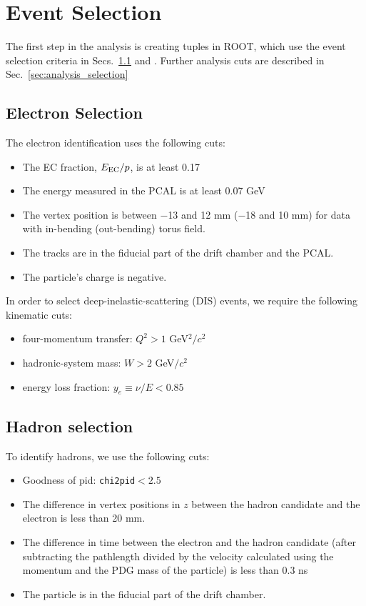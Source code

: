 \section{Event Selection} \label{sec:eventselection}
The first step in the analysis is creating tuples in ROOT, which use the event selection criteria in Secs.~\ref{sec:electron_selection} and 
\label{sec:hadron_selection}.  Further analysis cuts are described in Sec.~\ref{sec:analysis_selection}
\subsection{Electron Selection}
\label{sec:electron_selection}
The electron identification uses the following cuts:

\begin{itemize}
    \item The EC fraction, $E_{\rm EC}/p$, is at least 0.17
    \item The energy measured in the PCAL is at least 0.07 GeV
    \item The vertex position is between $-$13 and 12 mm ($-$18 and 10 mm) for data with in-bending (out-bending) torus field.  
    \item The tracks are in the fiducial part of the drift chamber and the PCAL.  
    \item The particle's charge is negative.
\end{itemize}


In order to select deep-inelastic-scattering (DIS) events, we require the following kinematic cuts:
\begin{itemize}
    \item four-momentum transfer: $Q^2>1$ GeV$^2/c^2$
    \item hadronic-system mass: $W>2$ GeV$/c^2$
    \item energy loss fraction: $y_e\equiv \nu/E<0.85$
\end{itemize}

\subsection{Hadron selection}
\label{sec:hadron_selection}
To identify hadrons, we use the following cuts:
\begin{itemize}
    \item Goodness of pid: \texttt{chi2pid}$<2.5$
    \item The difference in vertex positions in $z$ between the hadron candidate and the electron is less than 20 mm.  
    \item The difference in time between the electron and the hadron candidate (after subtracting the pathlength divided by the velocity calculated using the momentum and the PDG mass of the particle) is less than 0.3 ns
    \item The particle is in the fiducial part of the drift chamber.  
\end{itemize}

